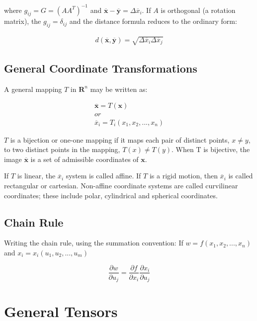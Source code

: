 \documentclass{article}
\begin{document}
where $g_{ij} = G = (AA^T)^{-1}$ and $\mathbf{ \overline{ x } } - \mathbf{ \overline{ y } } = \Delta \overline{ x }_i$.  If $A$ is orthogonal (a rotation matrix), the $g_{ij} = \delta_{ij}$ and the distance formula reduces to the ordinary form:

\begin{align*}
	d( \mathbf{ \overline{ x } }, \mathbf{ \overline{ y } } ) = \sqrt{ \Delta \overline{ x }_i \Delta \overline{ x }_j }
\end{align*}

\subsection{General Coordinate Transformations}

A general mapping $T$ in $\mathbf{ R }^n$ may be written as:

\begin{align*}
	\mathbf{ \overline{ x } } = T( \mathbf{ x } )\\
	or\\
	\overline{ x }_i = T_i( x_1, x_2, ..., x_n )
\end{align*}

$T$ is a bijection or one-one mapping if it maps each pair of distinct points, $x \neq y$, to two distinct points in the mapping, $T(x) \neq T(y)$.  When T is bijective, the image $\mathbf{ \overline{ x } }$ is a set of admissible coordinates of $\mathbf{ x }$.

If $T$ is linear, the $\overline{ x }_i$ system is called affine.  If $T$ is a rigid motion, then $\overline{ x }_i$ is called rectangular or cartesian.  Non-affine coordinate systems are called curvilinear coordinates; these include polar, cylindrical and spherical coordinates.

\subsection{Chain Rule}

Writing the chain rule, using the summation convention: If $w = f( x_1, x_2, ..., x_n )$ and $x_i = x_i( u_1, u_2,..., u_m )$

\begin{equation}
	\frac{ \partial w }{ \partial u_j } = \frac{ \partial f }{ \partial x_i } \frac{ \partial x_i }{ \partial u_j }
\end{equation}


%
%
\newpage
\section{General Tensors}
\end{document}
